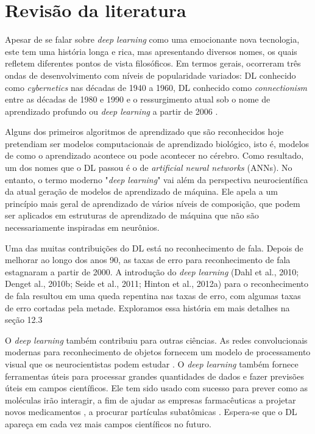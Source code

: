 
\section{Revisão da literatura }

Apesar de se falar sobre \textit{deep learning} como uma emocionante nova tecnologia, este tem uma história longa e rica, mas apresentando diversos nomes, os quais refletem diferentes pontos de vista filosóficos. Em termos gerais, ocorreram três ondas de desenvolvimento com níveis de popularidade variados: DL conhecido como \textit{cybernetics} nas décadas de 1940 a 1960, DL conhecido como \textit{connectionism} entre as décadas de 1980 e 1990 e o ressurgimento atual sob o nome de aprendizado profundo ou \textit{deep learning} a partir de 2006 \cite{Goodfellow-et-al-2016}.

Alguns dos primeiros algoritmos de aprendizado que são reconhecidos hoje pretendiam ser modelos computacionais de aprendizado biológico, isto é, modelos de como o aprendizado acontece ou pode acontecer no cérebro. Como resultado, um dos nomes que o DL passou é o de \textit{artificial neural networks} (ANNs). No entanto, o termo moderno "\textit{deep learning}" vai além da perspectiva neurocientífica da atual geração de modelos de aprendizado de máquina. Ele apela a um princípio mais geral de aprendizado de vários níveis de composição, que podem ser aplicados em estruturas de aprendizado de máquina que não são necessariamente inspiradas em neurônios.







Uma das muitas contribuições do DL está no reconhecimento de fala. Depois de melhorar ao longo dos anos 90, as taxas de erro para reconhecimento de fala estagnaram a partir de 2000. A introdução do \textit{deep learning} (Dahl et al., 2010; Denget al., 2010b; Seide et al., 2011; Hinton et al., 2012a) para o reconhecimento de fala resultou em uma queda repentina nas taxas de erro, com algumas taxas de erro cortadas pela metade. Exploramos essa história em mais detalhes na seção 12.3


O \textit{deep learning} também contribuiu para outras ciências. As redes convolucionais modernas para reconhecimento de objetos fornecem um modelo de processamento visual que os neurocientistas podem estudar \cite{dicarlo-afrax-yamins:2014}. O \textit{deep learning} também fornece ferramentas úteis para processar grandes quantidades de dados e fazer previsões úteis em campos científicos. Ele tem sido usado com sucesso para prever como as moléculas irão interagir, a fim de ajudar as empresas farmacêuticas a projetar novos medicamentos \cite{dahl2014multitask}, a procurar partículas subatômicas \cite{baldi:s:w:2015}. Espera-se que o DL apareça em cada vez mais campos científicos no futuro.

